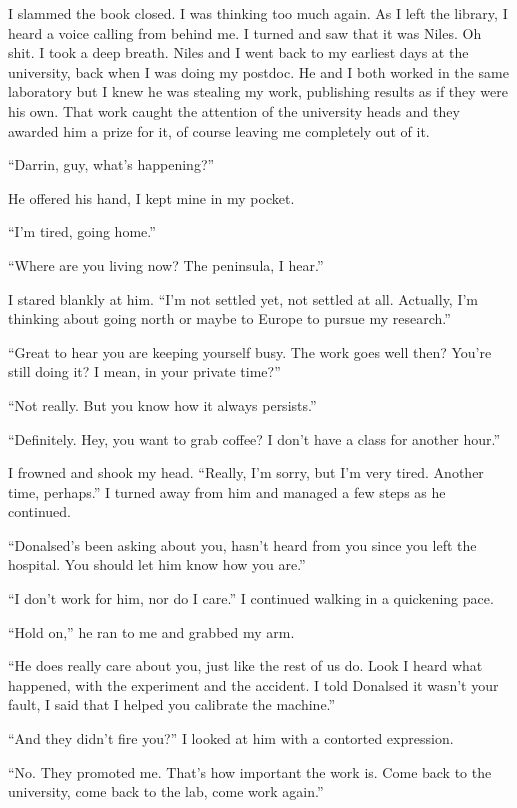 I slammed the book closed. I was thinking too much again. As I left the
library, I heard a voice calling from behind me. I turned and saw that
it was Niles. Oh shit. I took a deep breath. Niles and I went back to my
earliest days at the university, back when I was doing my postdoc. He
and I both worked in the same laboratory but I knew he was stealing my
work, publishing results as if they were his own. That work caught the
attention of the university heads and they awarded him a prize for it,
of course leaving me completely out of it.

``Darrin, guy, what's happening?''

He offered his hand, I kept mine in my pocket.

``I'm tired, going home.''

``Where are you living now? The peninsula, I hear.''

I stared blankly at him. ``I'm not settled yet, not settled at all.
Actually, I'm thinking about going north or maybe to Europe to pursue my
research.''

``Great to hear you are keeping yourself busy. The work goes well then?
You're still doing it? I mean, in your private time?''

``Not really. But you know how it always persists.''

``Definitely. Hey, you want to grab coffee? I don't have a class for
another hour.''

I frowned and shook my head. ``Really, I'm sorry, but I'm very tired.
Another time, perhaps.'' I turned away from him and managed a few steps
as he continued.

``Donalsed's been asking about you, hasn't heard from you since you left
the hospital. You should let him know how you are.''

``I don't work for him, nor do I care.'' I continued walking in a
quickening pace.

``Hold on,'' he ran to me and grabbed my arm.

``He does really care about you, just like the rest of us do. Look I
heard what happened, with the experiment and the accident. I told
Donalsed it wasn't your fault, I said that I helped you calibrate the
machine.''

``And they didn't fire you?'' I looked at him with a contorted
expression.

``No. They promoted me. That's how important the work is. Come back to
the university, come back to the lab, come work again.''

